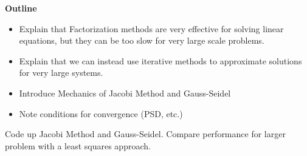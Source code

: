 

{\bf Outline}
\begin{itemize}
\item Explain that Factorization methods are very effective for solving linear equations, but they can be too slow for very large scale problems.
\item Explain that we can instead use iterative methods to approximate solutions for very large systems.
\item Introduce Mechanics of Jacobi Method and Gauss-Seidel
\item Note conditions for convergence (PSD, etc.)
\end{itemize}

\begin{problem}
Code up Jacobi Method and Gauss-Seidel. Compare performance for larger problem with a least squares approach.
\end{problem}